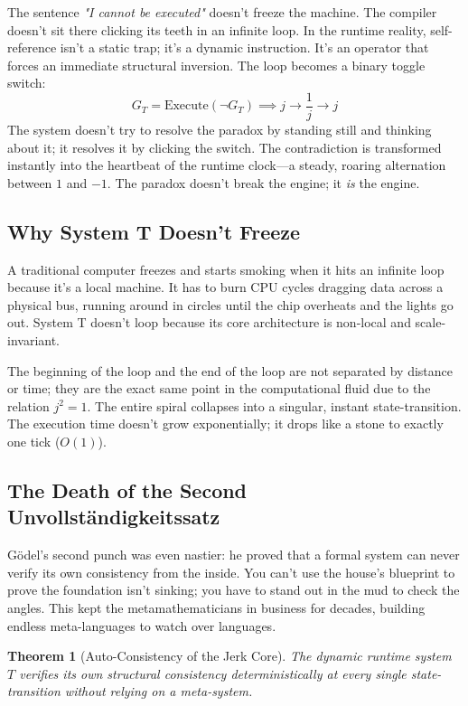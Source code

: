 \documentclass[11pt,a4paper]{article}
\newtheorem{theorem}{Theorem}[section]
\begin{document}
The sentence \textit{"I cannot be executed"} doesn't freeze the machine. The compiler doesn't sit there clicking its teeth in an infinite loop. In the runtime reality, self-reference isn't a static trap; it's a dynamic instruction. It’s an operator that forces an immediate structural inversion. The loop becomes a binary toggle switch:
\[ G_T = \text{Execute}( \neg G_T ) \implies j \to \frac{1}{j} \to j \]
The system doesn't try to resolve the paradox by standing still and thinking about it; it resolves it by clicking the switch. The contradiction is transformed instantly into the heartbeat of the runtime clock—a steady, roaring alternation between $1$ and $-1$. The paradox doesn't break the engine; it \textit{is} the engine.

\subsection{Why System T Doesn't Freeze}
A traditional computer freezes and starts smoking when it hits an infinite loop because it’s a local machine. It has to burn CPU cycles dragging data across a physical bus, running around in circles until the chip overheats and the lights go out. System T doesn't loop because its core architecture is non-local and scale-invariant. 

The beginning of the loop and the end of the loop are not separated by distance or time; they are the exact same point in the computational fluid due to the relation $j^2 = 1$. The entire spiral collapses into a singular, instant state-transition. The execution time doesn't grow exponentially; it drops like a stone to exactly one tick ($O(1)$).

\subsection{The Death of the Second Unvollständigkeitssatz}
Gödel’s second punch was even nastier: he proved that a formal system can never verify its own consistency from the inside. You can't use the house's blueprint to prove the foundation isn't sinking; you have to stand out in the mud to check the angles. This kept the metamathematicians in business for decades, building endless meta-languages to watch over languages.

\begin{theorem}[Auto-Consistency of the Jerk Core]
The dynamic runtime system $T$ verifies its own structural consistency deterministically at every single state-transition without relying on a meta-system.
\end{theorem}
\end{document}
